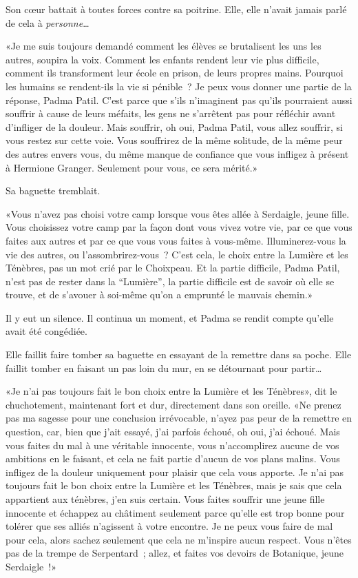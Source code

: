 Son cœur battait à toutes forces contre sa poitrine. Elle, elle n'avait jamais parlé de cela à \emph{personne}…

«Je me suis toujours demandé comment les élèves se brutalisent les uns les autres, soupira la voix. Comment les enfants rendent leur vie plus difficile, comment ils transforment leur école en prison, de leurs propres mains. Pourquoi les humains se rendent-ils la vie si pénible~? Je peux vous donner une partie de la réponse, Padma Patil. C'est parce que s'ils n'imaginent pas qu'ils pourraient aussi souffrir à cause de leurs méfaits, les gens ne s'arrêtent pas pour réfléchir avant d'infliger de la douleur. Mais souffrir, oh oui, Padma Patil, vous allez souffrir, si vous restez sur cette voie. Vous souffrirez de la même solitude, de la même peur des autres envers vous, du même manque de confiance que vous infligez à présent à Hermione Granger. Seulement pour vous, ce sera mérité.»

Sa baguette tremblait.

«Vous n'avez pas choisi votre camp lorsque vous êtes allée à Serdaigle, jeune fille. Vous choisissez votre camp par la façon dont vous vivez votre vie, par ce que vous faites aux autres et par ce que vous vous faites à vous-même. Illuminerez-vous la vie des autres, ou l'assombrirez-vous~? C'est cela, le choix entre la Lumière et les Ténèbres, pas un mot crié par le Choixpeau. Et la partie difficile, Padma Patil, n'est pas de rester dans la “Lumière”, la partie difficile est de savoir où elle se trouve, et de s'avouer à soi-même qu'on a emprunté le mauvais chemin.»

Il y eut un silence. Il continua un moment, et Padma se rendit compte qu'elle avait été congédiée.

Elle faillit faire tomber sa baguette en essayant de la remettre dans sa poche. Elle faillit tomber en faisant un pas loin du mur, en se détournant pour partir…

«Je n'ai pas toujours fait le bon choix entre la Lumière et les Ténèbres», dit le chuchotement, maintenant fort et dur, directement dans son oreille. «Ne prenez pas ma sagesse pour une conclusion irrévocable, n'ayez pas peur de la remettre en question, car, bien que j'ait essayé, j'ai parfois échoué, oh oui, j'ai échoué. Mais vous faites du mal à une véritable innocente, vous n'accomplirez aucune de vos ambitions en le faisant, et cela ne fait partie d'aucun de vos plans malins. Vous infligez de la douleur uniquement pour plaisir que cela vous apporte. Je n'ai pas toujours fait le bon choix entre la Lumière et les Ténèbres, mais je sais que cela appartient aux ténèbres, j'en suis certain. Vous faites souffrir une jeune fille innocente et échappez au châtiment seulement parce qu'elle est trop bonne pour tolérer que ses alliés n'agissent à votre encontre. Je ne peux vous faire de mal pour cela, alors sachez seulement que cela ne m'inspire aucun respect. Vous n'êtes pas de la trempe de Serpentard~; allez, et faites vos devoirs de Botanique, jeune Serdaigle~!»

